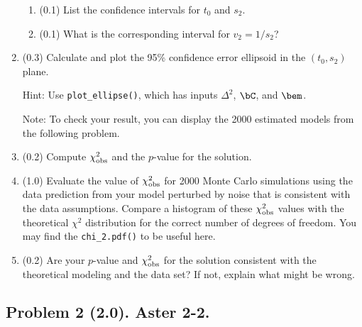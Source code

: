 \documentclass[11pt,titlepage,fleqn]{article}
\begin{document}
\begin{enumerate}
\begin{enumerate}
\item (0.1) List the confidence intervals for $t_0$ and $s_2$.
\item (0.1) What is the corresponding interval for $v_2 = 1/s_2$?
\end{enumerate}

\item (0.3) Calculate and plot the 95\% confidence error ellipsoid in the $(t_0, s_2)$ plane.

Hint: Use \verb+plot_ellipse()+, which has inputs $\Delta^2$, $\bC$, and $\bem$.

Note: To check your result, you can display the 2000 estimated models from the following problem.

\item (0.2) Compute $\chi^2_{\rm obs}$ and the $p$-value for the solution.

\item (1.0) Evaluate the value of $\chi^2_{\rm obs}$ for 2000 Monte Carlo simulations using the data prediction from your model perturbed by noise that is consistent with the data assumptions. Compare a histogram of these $\chi^2_{\rm obs}$ values with the theoretical $\chi^2$ distribution for the correct number of degrees of freedom.
You may find the \verb+chi_2.pdf()+ to be useful here.

\label{monte}

\item (0.2) Are your $p$-value and $\chi^2_{\rm obs}$ for the solution consistent with the theoretical modeling and the data set? If not, explain what might be wrong.

\end{enumerate}


\subsection*{Problem 2 (2.0). Aster 2-2.}
\end{document}
